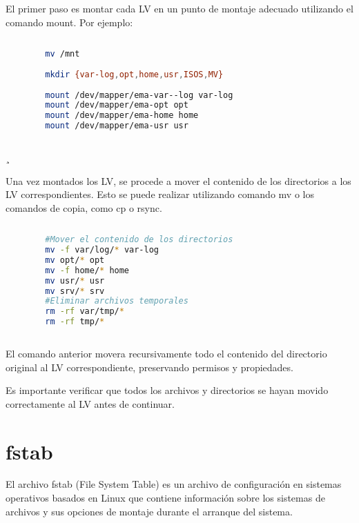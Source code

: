 		El primer paso es montar cada LV en un punto de montaje adecuado utilizando el comando mount. Por ejemplo:\par 
		
				
	\begin{lstlisting}[language=Bash, caption=Crear directorios y montar los (LVs)]
		
		mv /mnt
		
		mkdir {var-log,opt,home,usr,ISOS,MV}
		
		mount /dev/mapper/ema-var--log var-log
		mount /dev/mapper/ema-opt opt
		mount /dev/mapper/ema-home home
		mount /dev/mapper/ema-usr usr
		
	\end{lstlisting}
	¸
	
		Una vez montados los LV, se procede a mover el contenido de los directorios a los LV correspondientes. Esto se puede realizar utilizando comando mv o los comandos de copia, como cp o rsync. \par
		
	\begin{lstlisting}[language=Bash, caption=Mover directorios]
		
		#Mover el contenido de los directorios
		mv -f var/log/* var-log
		mv opt/* opt
		mv -f home/* home
		mv usr/* usr
		mv srv/* srv
		#Eliminar archivos temporales
		rm -rf var/tmp/*
		rm -rf tmp/*
		
	\end{lstlisting}
		
		El comando anterior movera recursivamente todo el contenido del directorio original al LV correspondiente, preservando permisos y propiedades.\par
		
		Es importante verificar que todos los archivos y directorios se hayan movido correctamente al LV antes de continuar.\par
	

		\vspace{0.3cm}
		
		\section{fstab}
						
			El archivo fstab (File System Table) es un archivo de configuración en sistemas operativos basados en Linux que contiene información sobre los sistemas de archivos y sus opciones de montaje durante el arranque del sistema.\par
			
